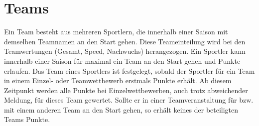 \section{Teams}
Ein Team besteht aus mehreren Sportlern, die innerhalb einer Saison mit demselben Teamnamen an den Start gehen. Diese Teameinteilung wird bei den Teamwertungen (Gesamt, Speed, Nachwuchs) herangezogen. Ein Sportler kann innerhalb einer Saison für maximal ein Team an den Start gehen und Punkte erlaufen. Das Team eines Sportlers ist festgelegt, sobald der Sportler für ein Team in einem Einzel- oder Teamwettbewerb erstmals Punkte erhält. Ab diesem Zeitpunkt werden alle Punkte bei Einzelwettbewerben, auch trotz abweichender Meldung, für dieses Team gewertet. Sollte er in einer Teamveranstaltung für bzw. mit einem anderen Team an den Start gehen, so erhält keines der beteiligten Teams Punkte. 